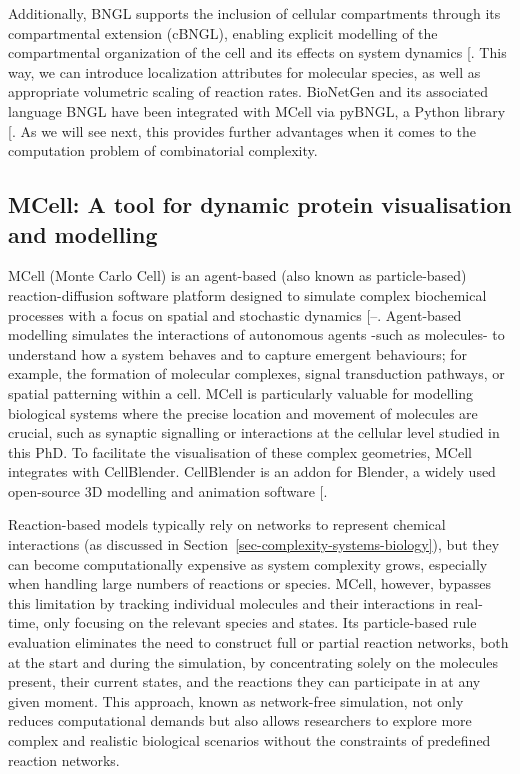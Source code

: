 \documentclass[
  11pt,
  letterpaper,
]{scrreprt}
\begin{document}
Additionally, BNGL supports the inclusion of cellular compartments
through its compartmental extension (cBNGL), enabling explicit modelling
of the compartmental organization of the cell and its effects on system
dynamics {[}\citeproc{ref-harris2009Compartmental}{287}{]}. This way, we
can introduce localization attributes for molecular species, as well as
appropriate volumetric scaling of reaction rates. BioNetGen and its
associated language BNGL have been integrated with MCell via pyBNGL, a
Python library {[}\citeproc{ref-husar2022MCell4}{244}{]}. As we will see
next, this provides further advantages when it comes to the computation
problem of combinatorial complexity.

\subsection*{MCell: A tool for dynamic protein visualisation and
modelling}\label{mcell-a-tool-for-dynamic-protein-visualisation-and-modelling}

MCell (Monte Carlo Cell) is an agent-based (also known as
particle-based) reaction-diffusion software platform designed to
simulate complex biochemical processes with a focus on spatial and
stochastic dynamics
{[}--\citeproc{ref-husar2022MCell4}{244}{]}.
Agent-based modelling simulates the interactions of autonomous agents
-such as molecules- to understand how a system behaves and to capture
emergent behaviours; for example, the formation of molecular complexes,
signal transduction pathways, or spatial patterning within a cell. MCell
is particularly valuable for modelling biological systems where the
precise location and movement of molecules are crucial, such as synaptic
signalling or interactions at the cellular level studied in this PhD. To
facilitate the visualisation of these complex geometries, MCell
integrates with CellBlender. CellBlender is an addon for Blender, a
widely used open-source 3D modelling and animation software
{[}\citeproc{ref-gupta2018Spatial}{298}{]}.

Reaction-based models typically rely on networks to represent chemical
interactions (as discussed in
Section~\ref{sec-complexity-systems-biology}), but they can become
computationally expensive as system complexity grows, especially when
handling large numbers of reactions or species. MCell, however, bypasses
this limitation by tracking individual molecules and their interactions
in real-time, only focusing on the relevant species and states. Its
particle-based rule evaluation eliminates the need to construct full or
partial reaction networks, both at the start and during the simulation,
by concentrating solely on the molecules present, their current states,
and the reactions they can participate in at any given moment. This
approach, known as network-free simulation, not only reduces
computational demands but also allows researchers to explore more
complex and realistic biological scenarios without the constraints of
predefined reaction networks.
\end{document}
